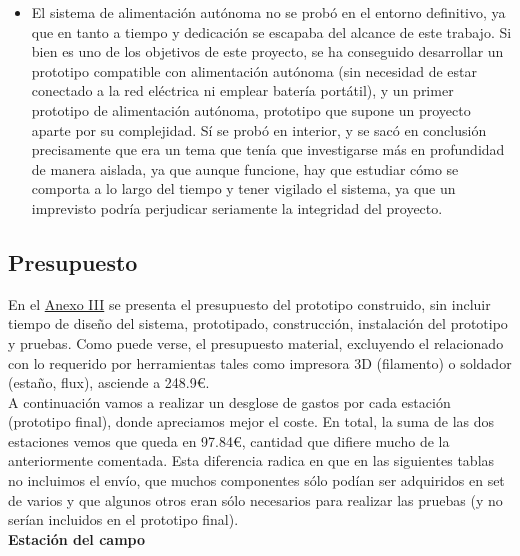 \documentclass[12pt]{article}
\begin{document}
\begin{itemize}
		\item El sistema de alimentación autónoma no se probó en el entorno definitivo, ya que en tanto a tiempo y dedicación se escapaba del alcance de este trabajo. Si bien es uno de los objetivos de este proyecto, se ha conseguido desarrollar un prototipo compatible con alimentación autónoma (sin necesidad de estar conectado a la red eléctrica ni emplear batería portátil), y un primer prototipo de alimentación autónoma, prototipo que supone un proyecto aparte por su complejidad. Sí se probó en interior, y se sacó en conclusión precisamente que era un tema que tenía que investigarse más en profundidad de manera aislada, ya que aunque funcione, hay que estudiar cómo se comporta a lo largo del tiempo y tener vigilado el sistema, ya que un imprevisto podría perjudicar seriamente la integridad del proyecto.
	\end{itemize}
	
	\pagebreak
	
	\subsection[Presupuesto]{Presupuesto}

	\noindent En el \hyperref[anexo III: presupuesto]{Anexo III} se presenta el presupuesto del prototipo construido, sin incluir tiempo de diseño del sistema, prototipado, construcción, instalación del prototipo y pruebas. Como puede verse, el presupuesto material, excluyendo el relacionado con lo requerido por herramientas tales como impresora 3D (filamento) o soldador (estaño, flux), asciende a 248.9\euro.\\
	
	\noindent A continuación vamos a realizar un desglose de gastos por cada estación (prototipo final), donde apreciamos mejor el coste. En total, la suma de las dos estaciones vemos que queda en 97.84\euro, cantidad que difiere mucho de la anteriormente comentada. Esta diferencia radica en que en las siguientes tablas no incluimos el envío, que muchos componentes sólo podían ser adquiridos en set de varios y que algunos otros eran sólo necesarios para realizar las pruebas (y no serían incluidos en el prototipo final). \\
	
	\noindent \textbf{Estación del campo}\\
	
\end{document}
